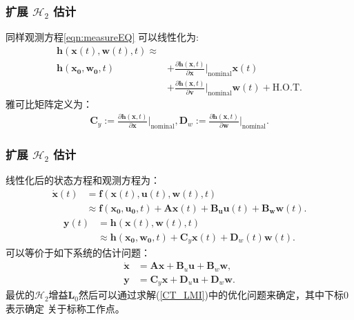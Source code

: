\documentclass{beamer}
\newcommand{\vo}[1]{\boldsymbol{#1}}
\begin{document}
\begin{frame}
	\frametitle{扩展 $\mathcal{H}_2$ 估计}
	同样观测方程\eqref{eqn:measureEQ} 可以线性化为:
	\begin{align}
		\vo{h}(\vo{x}(t), \vo{w}(t), t) \approx \nonumber\\
		\vo{h}(\vo{x_0}, \vo{w_0}, t) &+\frac{\partial \vo{h} (\vo{x},t)}{\partial \vo{x}}\Bigg|_{\text{nominal}} \vo{x}(t)\nonumber\\
		&+ \frac{\partial \vo{h} (\vo{x},t)}{\partial \vo{v}}\Bigg|_{\text{nominal}} \vo{w}(t) + \textrm{H.O.T.}
	\end{align}
	雅可比矩阵定义为：
	\begin{align}
		\vo{C}_y  := \frac{\partial \vo{h} (\vo{x},t)}{\partial \vo{x}}\Bigg|_{\text{nominal}},
		\vo{D}_w  := \frac{\partial \vo{h} (\vo{x},t)}{\partial \vo{w}}\Bigg|_{\text{nominal}}.\nonumber
	\end{align}
\end{frame}

\begin{frame}
	\frametitle{扩展 $\mathcal{H}_2$ 估计}
	线性化后的状态方程和观测方程为：
	 \begin{align}
		\Dot{\vo{x}}(t) &= \vo{f}(\vo{x}(t),\vo{u}(t),\vo{w}(t),t)\\
		&\approx \vo{f}(\vo{x_0},\vo{u_0}, t) + \vo{A} \vo{x}(t) + \vo{B_u} \vo{u}(t) + \vo{B_w} \vo{w}(t) .\nonumber
	\end{align}
 \begin{align}
	\vo{y}(t) &= \vo{h}(\vo{x}(t),\vo{w}(t),t)\\
	&\approx \vo{h}(\vo{x_0},\vo{w_0}, t) + \vo{C}_y \vo{x}(t) + \vo{D}_w(t) \vo{w}(t).\nonumber
\end{align}
可以等价于如下系统的估计问题：
\begin{subequations}\label{Lin_systems}
	\begin{align}
		\Dot{\vo{x}} &=  \vo{A}  \vo{x} + \vo{B}_u  \vo{u} + \vo{B}_w  \vo{w},\\
		\vo{y} &= \vo{C}_y  \vo{x} + \vo{D}_u  \vo{u}+ \vo{D}_w  \vo{w}.
	\end{align}
\end{subequations}
最优的$\mathcal{H}_2$增益$\vo{L}_0$然后可以通过求解(\ref{CT_LMI})中的优化问题来确定，其中下标$0$表示确定 关于标称工作点。
\end{frame}
\end{document}
